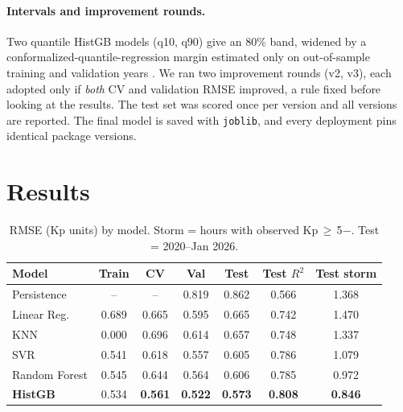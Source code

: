 \documentclass[11pt,a4paper]{article}
\newcommand{\code}[1]{\texttt{\small #1}}
\begin{document}
\paragraph{Intervals and improvement rounds.} Two quantile HistGB models (q10, q90) give an 80\% band, widened by a
conformalized-quantile-regression margin estimated only on out-of-sample training and validation years
\cite{romano2019}. We ran two improvement rounds (v2, v3), each adopted only if \emph{both} CV and validation RMSE
improved, a rule fixed before looking at the results. The test set was scored once per version and all versions are
reported. The final model is saved with \code{joblib}, and every deployment pins identical package versions.

\section{Results}
\begin{table}[htbp]\centering
\caption{RMSE (Kp units) by model. Storm = hours with observed Kp\,$\ge$\,5$-$. Test = 2020--Jan 2026.}\label{tab:results}
\setlength{\tabcolsep}{8pt}
\begin{tabular}{@{}lcccccc@{}}\toprule
Model & Train & CV & Val & Test & Test $R^2$ & Test storm\\\midrule
Persistence & -- & -- & 0.819 & 0.862 & 0.566 & 1.368\\
Linear Reg. & 0.689 & 0.665 & 0.595 & 0.665 & 0.742 & 1.470\\
KNN & 0.000 & 0.696 & 0.614 & 0.657 & 0.748 & 1.337\\
SVR & 0.541 & 0.618 & 0.557 & 0.605 & 0.786 & 1.079\\
Random Forest & 0.545 & 0.644 & 0.564 & 0.606 & 0.785 & 0.972\\
\textbf{HistGB} & 0.534 & \textbf{0.561} & \textbf{0.522} & \textbf{0.573} & \textbf{0.808} & \textbf{0.846}\\\bottomrule
\end{tabular}
\end{table}
\end{document}
